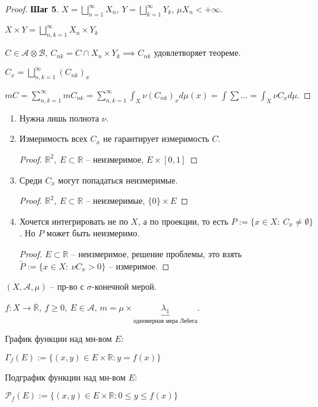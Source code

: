 \begin{proof}
    \textbf{Шаг 5}. $X = \bigsqcup_{n=1}^{\infty} X_n$, $Y = \bigsqcup_{k=1}^{\infty} Y_k$, $\mu X_n < +\infty$.

    $X \times Y = \bigsqcup_{n, k = 1}^{\infty} X_n \times Y_k$

    $C \in \mathcal{A} \otimes \mathcal{B}$, $C_{nk} = C \cap X_n \times Y_k \implies C_{nk}$ удовлетворяет теореме.

    $C_x = \bigsqcup_{n, k = 1}^{\infty} (C_{nk})_x$


    $m C = \sum_{n, k = 1}^{\infty} m C_{nk} = \sum_{n, k = 1}^{\infty} \int_{X} {\nu (C_{nk})_x d \mu (x)} = \int \sum \dots = \int_X {\nu C_x d \mu}$.
\end{proof}

\begin{remark}
    \begin{enumerate}
        \item Нужна лишь полнота $\nu$.
        \item {
            Измеримость всех $C_x$ не гарантирует измеримость $C$.

            \begin{proof}
                $\mathbb{R}^2, \ E \subset \mathbb{R}$ -- неизмеримое, $E \times [0, 1]$
            \end{proof}
        }
        \item {
            Среди $C_x$ могут попадаться неизмеримые.

            \begin{proof}
                $\mathbb{R}^2, \ E \subset \mathbb{R}$ -- неизмеримые, $\{0\} \times E$
            \end{proof}
        }
        \item {
            Хочется интегрировать не по $X$, а по проекции, то есть $P := \{ x \in X: \ C_x \not = \emptyset \}$. Но $P$ может быть неизмеримо.

            \begin{proof}

                $E \subset \mathbb{R}$ -- неизмеримое, решение проблемы, это взять $\tilde{P} := \{ x \in X: \ \nu C_x > 0 \}$ -- измеримое.
            \end{proof}
        }
    \end{enumerate}
\end{remark}

\begin{definition}
    $(X, \mathcal{A}, \mu)$ -- пр-во с $\sigma$-конечной мерой.

    $f: X \rightarrow \overline{\mathbb{R}}, \ f \geq 0, \ E \in \mathcal{A}$, $m = \mu \times \underbrace{\lambda_1}_{\text{одномерная мера Лебега}}$.

    График функции над мн-вом $E$:
    
    $\Gamma_f(E) := \{ (x, y) \in E \times \mathbb{R} : y = f(x) \}$
    
    Подграфик функции над мн-вом $E$:

    $\mathcal{P}_f(E) := \{ (x, y) \in E \times \mathbb{R}: 0 \leq y \leq f(x) \}$
\end{definition}

